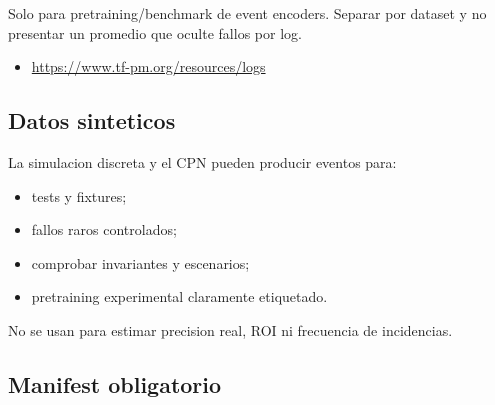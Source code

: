 \documentclass[
  spanish,
  10pt,
  a4paper,
]{article}
\providecommand{\tightlist}{%
  \setlength{\itemsep}{0pt}\setlength{\parskip}{0pt}}
\begin{document}
Solo para pretraining/benchmark de event encoders. Separar por dataset y
no presentar un promedio que oculte fallos por log.

\begin{itemize}
\tightlist
\item
  \url{https://www.tf-pm.org/resources/logs}
\end{itemize}

\subsection{Datos sinteticos}\label{datos-sinteticos}

La simulacion discreta y el CPN pueden producir eventos para:

\begin{itemize}
\tightlist
\item
  tests y fixtures;
\item
  fallos raros controlados;
\item
  comprobar invariantes y escenarios;
\item
  pretraining experimental claramente etiquetado.
\end{itemize}

No se usan para estimar precision real, ROI ni frecuencia de
incidencias.

\subsection{Manifest obligatorio}\label{manifest-obligatorio}
\end{document}
